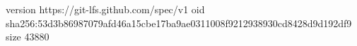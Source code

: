 version https://git-lfs.github.com/spec/v1
oid sha256:53d3b86987079afd46a15cbe17ba9ae0311008f9212938930cd8428d9d192df9
size 43880
